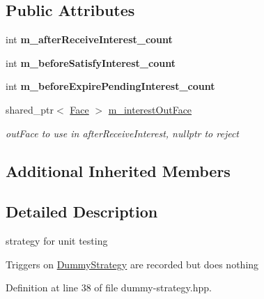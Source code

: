 \subsection*{Public Attributes}
\begin{DoxyCompactItemize}
\item 
int {\bfseries m\+\_\+after\+Receive\+Interest\+\_\+count}\hypertarget{classnfd_1_1tests_1_1DummyStrategy_ae31a2ce2c5f6a5274ef2fd64fc1dc586}{}\label{classnfd_1_1tests_1_1DummyStrategy_ae31a2ce2c5f6a5274ef2fd64fc1dc586}

\item 
int {\bfseries m\+\_\+before\+Satisfy\+Interest\+\_\+count}\hypertarget{classnfd_1_1tests_1_1DummyStrategy_af7a1fe95cef39893dc6e1ef15e7c14c4}{}\label{classnfd_1_1tests_1_1DummyStrategy_af7a1fe95cef39893dc6e1ef15e7c14c4}

\item 
int {\bfseries m\+\_\+before\+Expire\+Pending\+Interest\+\_\+count}\hypertarget{classnfd_1_1tests_1_1DummyStrategy_a6ad1be01007e14ef90659e53c1a5ff9d}{}\label{classnfd_1_1tests_1_1DummyStrategy_a6ad1be01007e14ef90659e53c1a5ff9d}

\item 
shared\+\_\+ptr$<$ \hyperlink{classnfd_1_1Face}{Face} $>$ \hyperlink{classnfd_1_1tests_1_1DummyStrategy_ab5f85fe6d7945ba190ecad9691c01e76}{m\+\_\+interest\+Out\+Face}\hypertarget{classnfd_1_1tests_1_1DummyStrategy_ab5f85fe6d7945ba190ecad9691c01e76}{}\label{classnfd_1_1tests_1_1DummyStrategy_ab5f85fe6d7945ba190ecad9691c01e76}

\begin{DoxyCompactList}\small\item\em out\+Face to use in after\+Receive\+Interest, nullptr to reject \end{DoxyCompactList}\end{DoxyCompactItemize}
\subsection*{Additional Inherited Members}


\subsection{Detailed Description}
strategy for unit testing 

Triggers on \hyperlink{classnfd_1_1tests_1_1DummyStrategy}{Dummy\+Strategy} are recorded but does nothing 

Definition at line 38 of file dummy-\/strategy.\+hpp.




